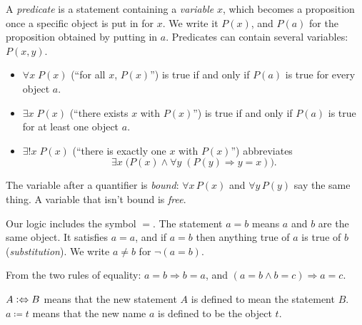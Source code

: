 \begin{definition}[Predicate]
\label{def:predicate}
A \emph{predicate} is a statement containing a \emph{variable} $x$, which becomes
a proposition once a specific object is put in for $x$. We write it $P(x)$, and
$P(a)$ for the proposition obtained by putting in $a$. Predicates can contain
several variables: $P(x, y)$.
\end{definition}

\begin{definition}[Quantifiers]
\label{def:quantifiers}
\leavevmode
\begin{itemize}
  \item $\forall x\; P(x)$ (\enquote{for all $x$, $P(x)$}) is true if and only if
    $P(a)$ is true for every object $a$.
  \item $\exists x\; P(x)$ (\enquote{there exists $x$ with $P(x)$}) is true if and
    only if $P(a)$ is true for at least one object $a$.
  \item $\exists! x\; P(x)$ (\enquote{there is exactly one $x$ with $P(x)$})
    abbreviates
    \[
      \exists x\; \bigl( P(x) \land \forall y\; (P(y) \Rightarrow y = x) \bigr).
    \]
\end{itemize}
The variable after a quantifier is \emph{bound}: $\forall x\, P(x)$ and $\forall
y\, P(y)$ say the same thing. A variable that isn't bound is \emph{free}.
\end{definition}

\begin{definition}[Equality]
\label{def:equality}
Our logic includes the symbol $=$. The statement $a = b$ means $a$ and $b$ are the
same object. It satisfies $a = a$, and if $a = b$ then anything true of $a$ is
true of $b$ (\emph{substitution}). We write $a \neq b$ for $\lnot (a = b)$.
\end{definition}

From the two rules of equality: $a = b \Rightarrow b = a$, and $(a = b \land b = c)
\Rightarrow a = c$.

\begin{definition}
\label{def:defining}
$A \mathrel{\vcentcolon\Leftrightarrow} B$ means that the new statement $A$ is defined to mean the statement
$B$. $a \coloneqq t$ means that the new name $a$ is defined to be the object $t$.
\end{definition}

